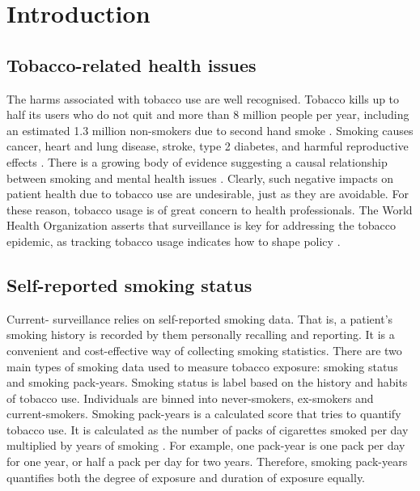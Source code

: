 \documentclass{article}
\begin{document}
\listoffigures
\listofequations
\listoftables

\newpage
{}

\section{Introduction}
\subsection{Tobacco-related health issues}
The harms associated with tobacco use are well recognised. Tobacco kills up to half its users who do not quit and more than 8 million people per year, including an estimated 1.3 million non-smokers due to second hand smoke \cite{who_tobacco}. Smoking causes cancer, heart and lung disease, stroke, type 2 diabetes, and harmful reproductive effects \cite{hhs_smoking_2014}. There is a growing body of evidence suggesting a causal relationship between smoking and mental health issues \cite{taylor2019smoking}. Clearly, such negative impacts on patient health due to tobacco use are undesirable, just as they are avoidable. For these reason, tobacco usage is of great concern to health professionals. The World Health Organization asserts that surveillance is key for addressing the tobacco epidemic, as tracking tobacco usage indicates how to shape policy \cite{who_tobacco}.

\subsection{Self-reported smoking status}
Current- surveillance relies on self-reported smoking data. That is, a patient's smoking history is recorded by them personally recalling and reporting. It is a convenient and cost-effective way of collecting smoking statistics. There are two main types of smoking data used to measure tobacco exposure: smoking status and smoking pack-years. Smoking status is label based on the history and habits of tobacco use. Individuals are binned into never-smokers, ex-smokers and current-smokers. Smoking pack-years is a calculated score that tries to quantify tobacco use. It is calculated as the number of packs of cigarettes smoked per day multiplied by years of smoking \cite{smokingpackyears}. For example, one pack-year is one pack per day for one year, or half a pack per day for two years. Therefore, smoking pack-years quantifies both the degree of exposure and duration of exposure equally.
\end{document}
